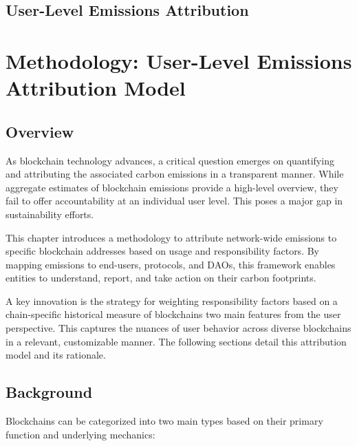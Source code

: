 \documentclass[11pt]{report}
\begin{document}
\section{User-Level Emissions Attribution}


\chapter{Methodology: User-Level Emissions Attribution Model}
\section{Overview}


As blockchain technology advances, a critical question emerges on quantifying and attributing the associated carbon emissions in a transparent manner. While aggregate estimates of blockchain emissions provide a high-level overview, they fail to offer accountability at an individual user level. This poses a major gap in sustainability efforts.

This chapter introduces a methodology to attribute network-wide emissions to specific blockchain addresses based on usage and responsibility factors. By mapping emissions to end-users, protocols, and DAOs, this framework enables entities to understand, report, and take action on their carbon footprints.

A key innovation is the strategy for weighting responsibility factors based on a chain-specific historical measure of blockchains two main features from the user perspective. This captures the nuances of user behavior across diverse blockchains in a relevant, customizable manner. The following sections detail this attribution model and its rationale.

\section{Background}

Blockchains can be categorized into two main types based on their primary function and underlying mechanics:
\end{document}

